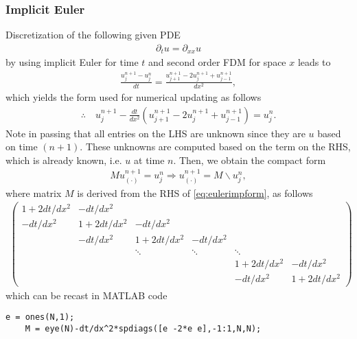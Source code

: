 \documentclass[12pt]{article}
\begin{document}
\subsubsection{Implicit Euler}
Discretization of the following given PDE
\begin{align}
	\partial_{t} u  = \partial_{xx} u
\end{align}
by using implicit Euler for time $t$ and second order FDM for space $x$ leads to 
\begin{align}
	\frac{u^{n+1}_{j} - u^{n}_{j}}{dt}
	= \frac{u^{n+1}_{j+1}-2u^{n+1}_{j}+u^{n+1}_{j-1}}{dx^2},
\end{align}
which yields the form used for numerical updating as follows
\begin{align}
	\label{eq:eulerimpform}
	\therefore\quad\boxed{
		u^{n+1}_{j} - \frac{dt}{dx^2} \left( u^{n+1}_{j+1}-2u^{n+1}_{j}+u^{n+1}_{j-1} \right)
		= u^{n}_{j}.
	}
\end{align}
Note in passing that all entries on the LHS are unknown since they are $u$ based on time $(n+1)$. 
These unknowns are computed based on the term on the RHS, which is already known, i.e. $u$ at time $n$.
Then, we obtain the compact form
\begin{align}
	M u^{n+1}_{(\cdot)} = u^{n}_{j}
	\Rightarrow
	u^{n+1}_{(\cdot)} = M\backslash u^{n}_{j},
\end{align}
where matrix $M$ is derived from the RHS of \eqref{eq:eulerimpform}, as follows
\begin{align}
	\begin{pmatrix}
		1+2dt/dx^2 & -dt/dx^2   &            &          &            &            \\
		-dt/dx^2   & 1+2dt/dx^2 & -dt/dx^2   &          &            &            \\
		           & -dt/dx^2   & 1+2dt/dx^2 & -dt/dx^2 &            &            \\
		           &            & \ddots     & \ddots   & \ddots     &            \\
		           &            &            &          & 1+2dt/dx^2 & -dt/dx^2   \\
		           &            &            &          & -dt/dx^2   & 1+2dt/dx^2
	\end{pmatrix}
\end{align}
which can be recast in MATLAB code 
\begin{lstlisting}[caption = {Matrix M.}]
	e = ones(N,1);
	M = eye(N)-dt/dx^2*spdiags([e -2*e e],-1:1,N,N);
\end{lstlisting}
\newpage
\end{document}
